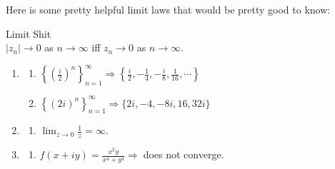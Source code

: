 \documentclass[10pt]{paper}
\newcommand{\gspc}{\vspace{0.13cm}} %
\newcommand{\gline}[0]{\gspc\\} %
\newcommand{\cpr}[1]{\left(#1\right)}
\begin{document}
Here is some pretty helpful limit laws that would be pretty good to know:
\begin{theorem}{Limit Shit}{}\gline{}
  $|z_n|\to 0$ as $n\to\infty$ iff $z_n\to 0$ as $n\to\infty$.
  \begin{enumerate}
    \item \begin{enumerate}
      \item [(a)]$\displaystyle\left\{\cpr{\frac{i}2}^n\right\}_{n=1}^\infty \Rightarrow \left\{\frac{i}2, -\frac{1}{4}, -\frac{i}8, \frac{1}{16},\cdots\right\}$
      \item [(b)]$\displaystyle\left\{(2i)^n\right\}_{n=1}^\infty \Rightarrow \{2i, -4, -8i, 16, 32i\}$
    \end{enumerate}
    \item \begin{enumerate}
      \item [(c)] $\displaystyle \lim_{z\to 0}\frac{1}z = \infty$.
    \end{enumerate}
    \item \begin{enumerate}
      \item [(d)] $f(x+iy) = \frac{x^2y}{x^4 + y^4} \Rightarrow\;$does not converge. 
    \end{enumerate}
  \end{enumerate}
\end{theorem}
\newpage
\end{document}
